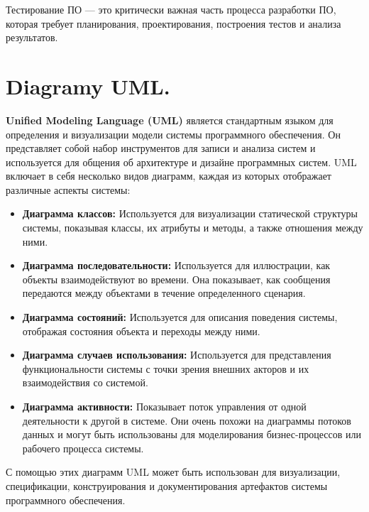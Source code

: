 Тестирование ПО — это критически важная часть процесса разработки ПО, которая требует планирования, проектирования, построения тестов и анализа результатов.


\section{Diagramy UML. }

\textbf{Unified Modeling Language (UML)} является стандартным языком для определения и визуализации модели системы программного обеспечения. Он представляет собой набор инструментов для записи и анализа систем и используется для общения об архитектуре и дизайне программных систем. UML включает в себя несколько видов диаграмм, каждая из которых отображает различные аспекты системы:

\begin{itemize}
\item \textbf{Диаграмма классов:} Используется для визуализации статической структуры системы, показывая классы, их атрибуты и методы, а также отношения между ними.

\item \textbf{Диаграмма последовательности:} Используется для иллюстрации, как объекты взаимодействуют во времени. Она показывает, как сообщения передаются между объектами в течение определенного сценария.

\item \textbf{Диаграмма состояний:} Используется для описания поведения системы, отображая состояния объекта и переходы между ними.

\item \textbf{Диаграмма случаев использования:} Используется для представления функциональности системы с точки зрения внешних акторов и их взаимодействия со системой.

\item \textbf{Диаграмма активности:} Показывает поток управления от одной деятельности к другой в системе. Они очень похожи на диаграммы потоков данных и могут быть использованы для моделирования бизнес-процессов или рабочего процесса системы.
\end{itemize}

С помощью этих диаграмм UML может быть использован для визуализации, спецификации, конструирования и документирования артефактов системы программного обеспечения.
